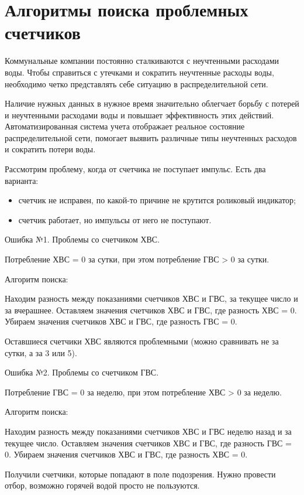 
\section{Алгоритмы поиска проблемных счетчиков}
Коммунальные компании постоянно сталкиваются с неучтенными расходами воды.
Чтобы справиться с утечками и сократить неучтенные расходы воды, необходимо четко представлять себе ситуацию в распределительной сети. \cite{smartcity}

Наличие нужных данных в нужное время значительно облегчает борьбу с потерей и неучтенными расходами воды и повышает эффективность этих действий. Автоматизированная система учета отображает реальное состояние распределительной сети, помогает выявить различные типы неучтенных расходов и сократить потери воды. 

Рассмотрим проблему, когда от счетчика не поступает импульс. Есть два варианта:
\begin{itemize}
	\item счетчик не исправен, по какой-то причине не крутится роликовый индикатор;
	\item счетчик работает, но импульсы от него не поступают.
\end{itemize}

Ошибка №1. Проблемы со счетчиком ХВС. 

Потребление ХВС = 0 за сутки, при этом потребление ГВС > 0 за сутки.

Алгоритм поиска:

Находим разность между показаниями счетчиков ХВС и ГВС, за текущее число и за вчерашнее.
Оставляем значения счетчиков ХВС и ГВС, где разность ХВС = 0.
Убираем значения счетчиков ХВС и ГВС, где разность ГВС = 0.

Оставшиеся счетчики ХВС являются проблемными (можно сравнивать не за сутки, а за 3 или 5).

Ошибка №2. Проблемы со счетчиком ГВС.

Потребление ГВС = 0 за неделю, при этом потребление ХВС > 0 за неделю.

Алгоритм поиска:

Находим разность между показаниями счетчиков ХВС и ГВС неделю назад и за текущее число.
Оставляем значения счетчиков ХВС и ГВС, где разность ГВС = 0.
Убираем значения счетчиков ХВС и ГВС, где разность ХВС = 0.

Получили счетчики, которые попадают в поле подозрения.
Нужно провести отбор, возможно горячей водой просто не пользуются.

